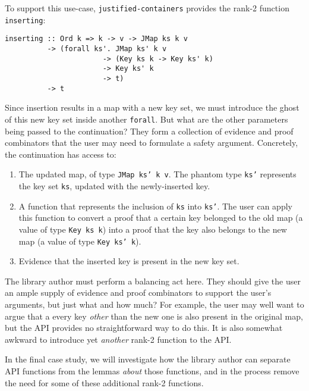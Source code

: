 \documentclass[format=sigplan, review=false, screen=true, 10pt]{acmart}
\makeatletter
\let\origsection\section
\renewcommand\section{\@ifstar{\starsection}{\nostarsection}}
\newcommand\nostarsection[1]
{\sectionprelude\origsection{#1}\sectionpostlude}
\newcommand\starsection[1]
{\sectionprelude\origsection*{#1}\sectionpostlude}
\newcommand\sectionprelude{%
  \vspace{-0.5em}
}
\newcommand\sectionpostlude{%
  \vspace{0em}
}
\makeatother
\begin{document}
To support this use-case, \texttt{justified-containers} provides the rank-2
function \texttt{inserting}:
\begin{verbatim}
inserting :: Ord k => k -> v -> JMap ks k v
          -> (forall ks'. JMap ks' k v
                       -> (Key ks k -> Key ks' k)
                       -> Key ks' k
                       -> t)
          -> t
\end{verbatim}
Since insertion results in a map with a new key set, we must
introduce the ghost of this new key set inside another \texttt{forall}.
But what are the other parameters being passed to the continuation?
They form a collection of evidence and proof combinators that the user may
need to formulate a safety argument. Concretely,  the continuation has access to:
\begin{enumerate}
\item The updated map, of type \texttt{JMap ks' k v}. The phantom type \texttt{ks'}
  represents the key set \texttt{ks}, updated with the newly-inserted key.
\item A function that represents the inclusion of \texttt{ks} into \texttt{ks'}.
  The user can apply this function to convert a proof that a certain key belonged to the
  old map (a value of type \texttt{Key ks k}) into a proof that the key also belongs to the new map (a value of type \texttt{Key ks' k}).
\item Evidence that the inserted key is present in the new key set.
\end{enumerate}

The library author must perform a balancing act here. They should give 
the user an ample supply of evidence and proof combinators to support the user's
arguments, but just what and how much? For example, the user may well want to argue that a
every key \emph{other} than the new one is also present in the original map,
 but the API provides no straightforward way to do this.
It is also somewhat awkward to introduce yet \emph{another}
rank-2 function to the API.

In the final case study, we will investigate how
the library author can separate API functions from the lemmas \emph{about} those
functions, and in the process remove the need for some of these additional
rank-2 functions.

\section{Case Study \#4: Arbitrary Invariants}\label{full-gdp}
\end{document}

